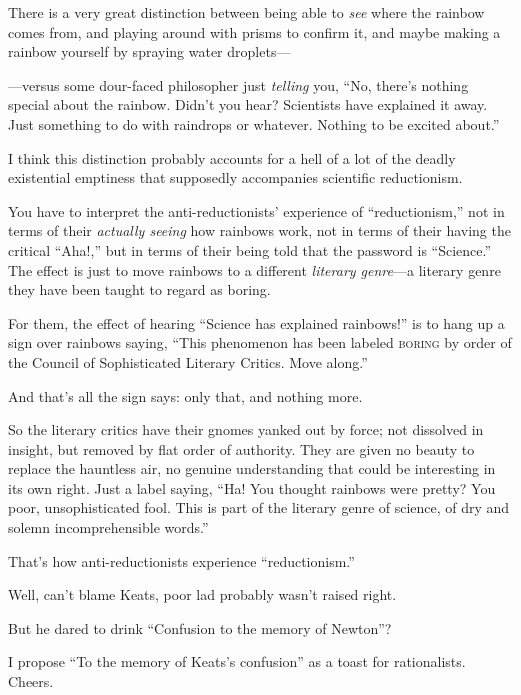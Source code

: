{
 There is a very great distinction between being able to
\textit{see} where the rainbow comes from, and playing around with
prisms to confirm it, and maybe making a rainbow yourself by spraying
water droplets---}

{
 {}---versus some dour-faced philosopher just \textit{telling} you,
``No, there's nothing special about
the rainbow. Didn't you hear? Scientists have explained
it away. Just something to do with raindrops or whatever. Nothing to be
excited about.''}

{
 I think this distinction probably accounts for a hell of a lot of
the deadly existential emptiness that supposedly accompanies scientific
reductionism.}

{
 You have to interpret the anti-reductionists'
experience of ``reductionism,'' not
in terms of their \textit{actually seeing} how rainbows work, not in
terms of their having the critical
``Aha!,'' but in terms of their
being told that the password is
``Science.'' The effect is just to
move rainbows to a different \textit{literary genre}{}---a literary
genre they have been taught to regard as boring.}

{
 For them, the effect of hearing ``Science has
explained rainbows!'' is to hang up a sign over
rainbows saying, ``This phenomenon has been labeled
\textsc{boring} by order of the Council of Sophisticated Literary Critics. Move
along.''}

{
 And that's all the sign says: only that, and
nothing more.}

{
 So the literary critics have their gnomes yanked out by force; not
dissolved in insight, but removed by flat order of authority. They are
given no beauty to replace the hauntless air, no genuine understanding
that could be interesting in its own right. Just a label saying,
``Ha! You thought rainbows were pretty? You poor,
unsophisticated fool. This is part of the literary genre of science, of
dry and solemn incomprehensible words.''}

{
 That's how anti-reductionists experience
``reductionism.''}

{
 Well, can't blame Keats, poor lad probably
wasn't raised right.}

{
 But he dared to drink ``Confusion to the memory
of Newton''?}

{
 I propose ``To the memory of
Keats's confusion'' as a toast for
rationalists. Cheers.}

\myendsectiontext


